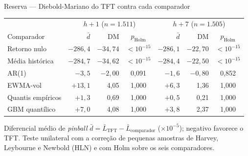 \documentclass[aspectratio=169,10pt]{beamer}
\newcommand{\hum}{\(h{+}1\)}
\newcommand{\hsete}{\(h{+}7\)}
\begin{document}
\begin{frame}{Reserva --- Diebold-Mariano do TFT contra cada comparador}
  \small
  \centering
  \begin{tabular}{l r r c r r c}
    \toprule
    & \multicolumn{3}{c}{\hum{} (\(n = 1.511\))} & \multicolumn{3}{c}{\hsete{} (\(n = 1.505\))} \\
    Comparador & \(\bar d\) & DM & \(p_{\text{Holm}}\) & \(\bar d\) & DM & \(p_{\text{Holm}}\) \\
    \midrule
    Retorno nulo & \(-286{,}4\) & \(-34{,}74\) & \(<10^{-15}\) & \(-286{,}1\) & \(-22{,}70\) & \(<10^{-15}\) \\
    Média histórica & \(-284{,}7\) & \(-34{,}62\) & \(<10^{-15}\) & \(-284{,}4\) & \(-22{,}50\) & \(<10^{-15}\) \\
    AR(1) & \(-3{,}5\) & \(-2{,}00\) & 0,091 & \(-1{,}6\) & \(-0{,}80\) & 0,852 \\
    EWMA-vol & \(+13{,}1\) & 4,05 & 1,000 & \(+6{,}3\) & 1,36 & 1,000 \\
    Quantis empíricos & \(+1{,}3\) & 0,69 & 1,000 & \(+0{,}5\) & 0,21 & 1,000 \\
    GBM quantílico & \(+7{,}0\) & 4,08 & 1,000 & \(+3{,}8\) & 2,37 & 1,000 \\
    \bottomrule
  \end{tabular}

  \vspace{6pt}
  \raggedright
  Diferencial médio de \textit{pinball} \(\bar d = \bar L_{\text{TFT}} - \bar L_{\text{comparador}}\)
  (\(\times 10^{-5}\)); negativo favorece o TFT. Teste unilateral com a correção de pequenas amostras de
  Harvey, Leybourne e Newbold (HLN) e com Holm
  sobre os seis comparadores.
\end{frame}
\end{document}
